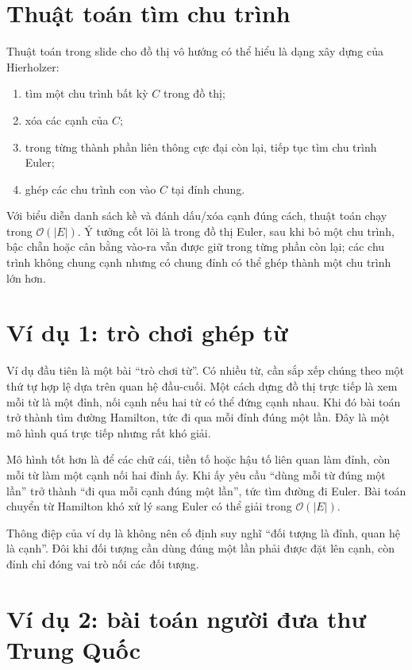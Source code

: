 \documentclass[11pt]{article}
\newcommand{\Oh}{\mathcal{O}}
\begin{document}
\section{Thuật toán tìm chu trình}

Thuật toán trong slide cho đồ thị vô hướng có thể hiểu là dạng xây dựng của
Hierholzer:
\begin{enumerate}
  \item tìm một chu trình bất kỳ \(C\) trong đồ thị;
  \item xóa các cạnh của \(C\);
  \item trong từng thành phần liên thông cực đại còn lại, tiếp tục tìm chu
  trình Euler;
  \item ghép các chu trình con vào \(C\) tại đỉnh chung.
\end{enumerate}

Với biểu diễn danh sách kề và đánh dấu/xóa cạnh đúng cách, thuật toán chạy
trong \(\Oh(|E|)\). Ý tưởng cốt lõi là trong đồ thị Euler, sau khi bỏ một chu
trình, bậc chẵn hoặc cân bằng vào-ra vẫn được giữ trong từng phần còn lại; các
chu trình không chung cạnh nhưng có chung đỉnh có thể ghép thành một chu trình
lớn hơn.

\section{Ví dụ 1: trò chơi ghép từ}

Ví dụ đầu tiên là một bài ``trò chơi từ''. Có nhiều từ, cần sắp xếp chúng theo
một thứ tự hợp lệ dựa trên quan hệ đầu-cuối. Một cách dựng đồ thị trực tiếp là
xem mỗi từ là một đỉnh, nối cạnh nếu hai từ có thể đứng cạnh nhau. Khi đó bài
toán trở thành tìm đường Hamilton, tức đi qua mỗi đỉnh đúng một lần. Đây là
một mô hình quá trực tiếp nhưng rất khó giải.

Mô hình tốt hơn là để các chữ cái, tiền tố hoặc hậu tố liên quan làm đỉnh, còn
mỗi từ làm một cạnh nối hai đỉnh ấy. Khi ấy yêu cầu ``dùng mỗi từ đúng một
lần'' trở thành ``đi qua mỗi cạnh đúng một lần'', tức tìm đường đi Euler. Bài
toán chuyển từ Hamilton khó xử lý sang Euler có thể giải trong \(\Oh(|E|)\).

Thông điệp của ví dụ là không nên cố định suy nghĩ ``đối tượng là đỉnh, quan
hệ là cạnh''. Đôi khi đối tượng cần dùng đúng một lần phải được đặt lên cạnh,
còn đỉnh chỉ đóng vai trò nối các đối tượng.

\section{Ví dụ 2: bài toán người đưa thư Trung Quốc}
\end{document}

